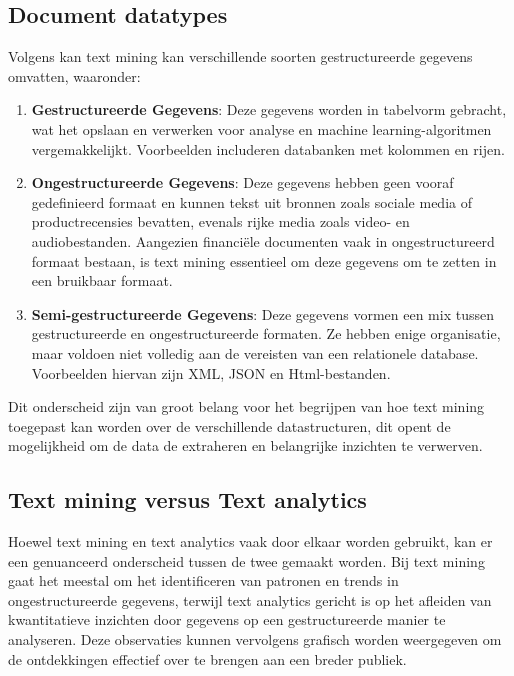 \subsection{Document datatypes}
Volgens \autocite{AWS2024} kan text mining kan verschillende soorten gestructureerde gegevens omvatten, waaronder:

\begin{enumerate}
    \item \textbf{Gestructureerde Gegevens}: Deze gegevens worden in tabelvorm gebracht, wat het opslaan en verwerken voor analyse en machine learning-algoritmen vergemakkelijkt. Voorbeelden includeren databanken met kolommen en rijen.
    \item \textbf{Ongestructureerde Gegevens}: Deze gegevens hebben geen vooraf gedefinieerd formaat en kunnen tekst uit bronnen zoals sociale media of productrecensies bevatten, evenals rijke media zoals video- en audiobestanden. Aangezien financiële documenten vaak in ongestructureerd formaat bestaan, is text mining essentieel om deze gegevens om te zetten in een bruikbaar formaat.
    \item \textbf{Semi-gestructureerde Gegevens}: Deze gegevens vormen een mix tussen gestructureerde en ongestructureerde formaten. Ze hebben enige organisatie, maar voldoen niet volledig aan de vereisten van een relationele database. Voorbeelden hiervan zijn XML, JSON en Html-bestanden.
\end{enumerate}

Dit onderscheid zijn van groot belang voor het begrijpen van hoe text mining toegepast kan worden over de verschillende datastructuren, dit opent de mogelijkheid om de data de extraheren en belangrijke inzichten te verwerven.

\subsection{Text mining versus Text analytics}
Hoewel text mining en text analytics vaak door elkaar worden gebruikt, kan er een genuanceerd onderscheid tussen de twee gemaakt worden. Bij text mining gaat het meestal om het identificeren van patronen en trends in ongestructureerde gegevens, terwijl text analytics gericht is op het afleiden van kwantitatieve inzichten door gegevens op een gestructureerde manier te analyseren. Deze observaties kunnen vervolgens grafisch worden weergegeven om de ontdekkingen effectief over te brengen aan een breder publiek.\autocite{IBM2024}

